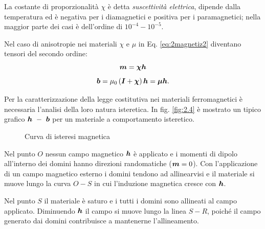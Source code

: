 La costante di proporzionalità $\chi$ è detta \textit{suscettività elettrica}, dipende dalla temperatura ed è negativa per i diamagnetici e positiva per i paramagnetici; nella maggior parte dei casi è dell'ordine di $10^{-4}-10^{-5}$.

Nel caso di anisotropie nei materiali  $\chi$ e $\mu$  in Eq. \eqref{eq:2magnetiz2} diventano tensori del secondo ordine:
 \begin{equation}
\label{eq:2magnetiz3}
\boldsymbol{m} = \boldsymbol{\chi} \boldsymbol{h}
\end{equation}
\begin{equation}
\label{eq:2magnetiz4}
\boldsymbol{b}= \mu_0 \left(\boldsymbol{I}+\boldsymbol{\chi}\right)\boldsymbol{h} = \boldsymbol{\mu} \boldsymbol{h} .
\end{equation}


Per la caratterizzazione della legge costitutiva nei materiali ferromagnetici è necessaria l'analisi della loro  natura isteretica. In fig. \ref{fig:2.4} è mostrato un tipico grafico $\boldsymbol{h}~-~\boldsymbol{b}$ per un materiale a comportamento isteretico.

\begin{figure}[htp]
\centering
\caption{Curva di isteresi magnetica}
\label{fig:2.5}
\end{figure}

Nel punto $O$ nessun campo magnetico $\boldsymbol{h}$ è applicato e i momenti di dipolo all'interno dei domini hanno direzioni randomatiche ($\boldsymbol{m} = 0$).  
Con l'applicazione di un campo magnetico esterno i domini tendono ad allinearvisi e il materiale si muove lungo la curva $O-S$ in cui l'induzione magnetica cresce con $\boldsymbol{h}$. 

Nel punto $S$ il materiale è saturo e i tutti i domini sono allineati al campo applicato. Diminuendo $\boldsymbol{h}$ il campo si muove lungo la linea $S-R$, poiché il campo generato dai  domini contribuisce a mantenerne l'allineamento. 

